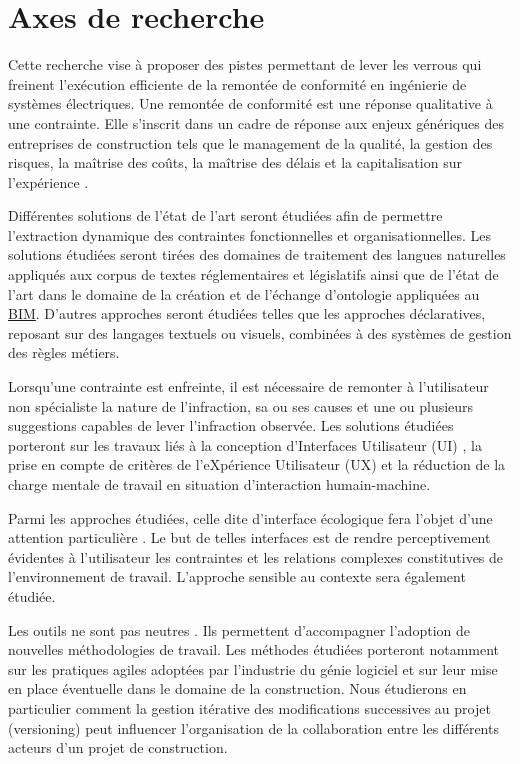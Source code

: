 \documentclass[a4paper,12pt]{article}
\begin{document}
\section{Axes de recherche}
\label{sec:orgdfcf293}
Cette recherche vise à proposer des pistes permettant de lever les verrous qui freinent l'exécution efficiente de la remontée de conformité en ingénierie de systèmes électriques. Une remontée de conformité est une réponse qualitative à une contrainte. Elle s’inscrit dans un cadre de réponse aux enjeux génériques des entreprises de construction tels que le management de la qualité, la gestion des risques, la maîtrise des coûts, la maîtrise des délais et la capitalisation sur l’expérience \autocite{ManagementProjetProgramme2017}.

Différentes solutions de l'état de l’art seront étudiées afin de permettre l’extraction dynamique des contraintes fonctionnelles et organisationnelles. Les solutions étudiées seront tirées des domaines de traitement des langues naturelles appliqués aux corpus de textes réglementaires et législatifs ainsi que de l'état de l’art dans le domaine de la création et de l’échange d’ontologie appliquées au \protect\hyperlink{gls-1}{\label{gls-1-use-10}BIM}. D’autres approches seront étudiées telles que les approches déclaratives, reposant sur des langages textuels ou visuels, combinées à des systèmes de gestion des règles métiers.

Lorsqu’une contrainte est enfreinte, il est nécessaire de remonter à l'utilisateur non spécialiste la nature de l’infraction, sa ou ses causes et une ou plusieurs suggestions capables de lever l’infraction observée. Les solutions étudiées porteront sur les travaux liés à la conception d’Interfaces Utilisateur (UI) \autocite{Shneiderman2016}, la prise en compte de critères de l’eXpérience Utilisateur (UX) \autocite{Nogier2020} et la réduction de la charge mentale de travail \autocite{longoHumanMentalWorkload2022a,morayMentalWorkloadIts1979a} en situation d’interaction humain-machine. 

Parmi les approches étudiées, celle dite d'interface écologique fera l’objet d’une attention particulière \autocite{Burns2004,vicenteEcologicalInterfaceDesign1992b}. Le but de telles interfaces est de rendre perceptivement évidentes à l'utilisateur les contraintes et les relations complexes constitutives de l’environnement de travail. L’approche sensible au contexte \autocite{deyUnderstandingUsingContext2001a} sera également étudiée.

Les outils ne sont pas neutres \autocite{borremansGuideConvivialTools1979a}. Ils permettent d’accompagner l’adoption de nouvelles méthodologies de travail. Les méthodes étudiées porteront notamment sur les pratiques agiles adoptées par l’industrie du génie logiciel et sur leur mise en place éventuelle dans le domaine de la construction. Nous étudierons en particulier comment la gestion itérative des modifications successives au projet (versioning) peut influencer l’organisation de la collaboration entre les différents acteurs d’un projet de construction.
\end{document}
